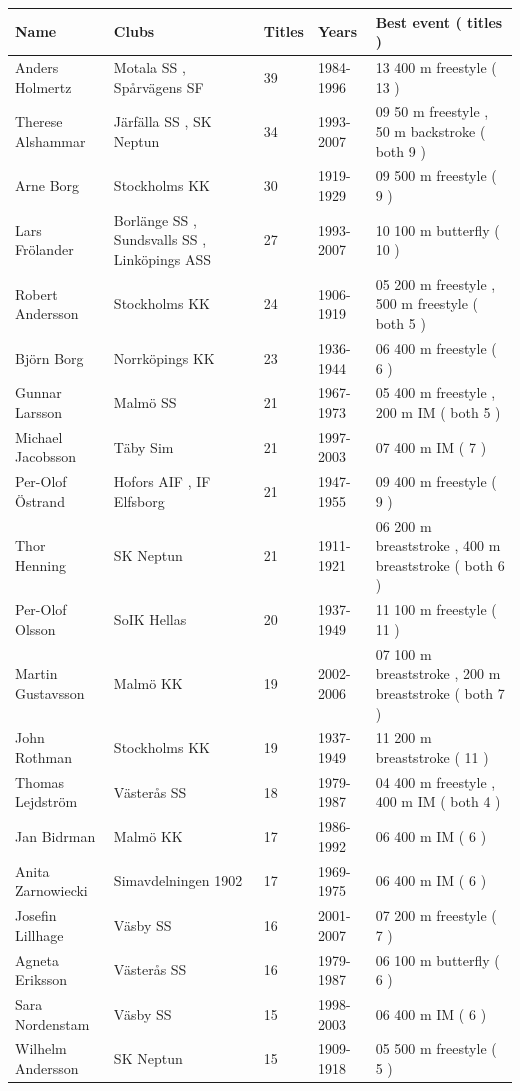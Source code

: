 \documentclass{article}
\begin{document}
\begin{tabular}{lllll}
\toprule
Name & Clubs & Titles & Years & Best event ( titles ) \\
\midrule
Anders Holmertz & Motala SS , Spårvägens SF & 39 & 1984-1996 & 13 400 m freestyle ( 13 ) \\
Therese Alshammar & Järfälla SS , SK Neptun & 34 & 1993-2007 & 09 50 m freestyle , 50 m backstroke ( both 9 ) \\
Arne Borg & Stockholms KK & 30 & 1919-1929 & 09 500 m freestyle ( 9 ) \\
Lars Frölander & Borlänge SS , Sundsvalls SS , Linköpings ASS & 27 & 1993-2007 & 10 100 m butterfly ( 10 ) \\
Robert Andersson & Stockholms KK & 24 & 1906-1919 & 05 200 m freestyle , 500 m freestyle ( both 5 ) \\
Björn Borg & Norrköpings KK & 23 & 1936-1944 & 06 400 m freestyle ( 6 ) \\
Gunnar Larsson & Malmö SS & 21 & 1967-1973 & 05 400 m freestyle , 200 m IM ( both 5 ) \\
Michael Jacobsson & Täby Sim & 21 & 1997-2003 & 07 400 m IM ( 7 ) \\
Per-Olof Östrand & Hofors AIF , IF Elfsborg & 21 & 1947-1955 & 09 400 m freestyle ( 9 ) \\
Thor Henning & SK Neptun & 21 & 1911-1921 & 06 200 m breaststroke , 400 m breaststroke ( both 6 ) \\
Per-Olof Olsson & SoIK Hellas & 20 & 1937-1949 & 11 100 m freestyle ( 11 ) \\
Martin Gustavsson & Malmö KK & 19 & 2002-2006 & 07 100 m breaststroke , 200 m breaststroke ( both 7 ) \\
John Rothman & Stockholms KK & 19 & 1937-1949 & 11 200 m breaststroke ( 11 ) \\
Thomas Lejdström & Västerås SS & 18 & 1979-1987 & 04 400 m freestyle , 400 m IM ( both 4 ) \\
Jan Bidrman & Malmö KK & 17 & 1986-1992 & 06 400 m IM ( 6 ) \\
Anita Zarnowiecki & Simavdelningen 1902 & 17 & 1969-1975 & 06 400 m IM ( 6 ) \\
Josefin Lillhage & Väsby SS & 16 & 2001-2007 & 07 200 m freestyle ( 7 ) \\
Agneta Eriksson & Västerås SS & 16 & 1979-1987 & 06 100 m butterfly ( 6 ) \\
Sara Nordenstam & Väsby SS & 15 & 1998-2003 & 06 400 m IM ( 6 ) \\
Wilhelm Andersson & SK Neptun & 15 & 1909-1918 & 05 500 m freestyle ( 5 ) \\
\bottomrule
\end{tabular}
\end{document}
